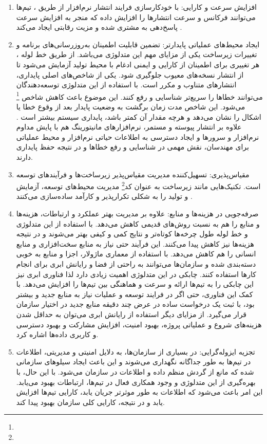\begin{enumerate}
	\item 
	افزایش سرعت و کارایی: با خودکارسازی فرایند انتشار نرم‌افزار از طریق ، تیم‌ها می‌توانند فرکانس و سرعت انتشارها را افزایش داده که منجر به افزایش سرعت پاسخ‌دهی به مشتری شده و مزیت رقابتی ایجاد می‌کند \cite{DevopsCICD1}.
	\item
	ایجاد محیط‌های عملیاتی پایدارتر: تضمین قابلیت اطمینان به‌روزرسانی‌های برنامه و تغییرات زیرساخت یکی از مزایای مهم این متدلوژی می‌باشد. از طریق خط لوله ، هر تغییری برای اطمینان از کارایی و ایمنی ادغام با محیط تولید آزمایش می‌شود تا از انتشار نسخه‌های معیوب جلوگیری شود. 
	یکی از شاخص‌های اصلی پایداری، انتشارهای متناوب و مکرر است. با استفاده از این متدلوژی توسعه‌دهندگان می‌توانند خطاها را سریع‌تر شناسایی و رفع کنند. این موضوع باعث کاهش شاخص \footnote{} می‌شود. این شاخص مدت زمان برگشت به وضعیت پایدار بعد از وقوع خطا یا اشکال را نشان می‌دهد و هرچه مقدار آن کمتر باشد، پایداری سیستم بیشتر است \cite{DevopsCD}.
	علاوه بر انتشار پیوسته و مستمر، نرم‌افزارهای مانیتورینگ هم با پایش مداوم نرم‌افزار و سرور‌ها و ایجاد دسترسی به اطلاعات حیاتی نرم‌افزار و محیط عملیاتی برای مهندسان، نقش مهمی در شناسایی و رفع خطاها و در نتیجه حفظ پایداری دارند.
	\item 
	مقیاس‌پذیری: تسهیل‌کننده مدیریت مقیاس‌پذیر زیرساخت‌ها و فرآیندهای توسعه است. تکنیک‌هایی مانند زیرساخت به عنوان کد\footnote{} مدیریت محیط‌های توسعه، آزمایش و تولید را به شکلی تکرارپذیر و کارآمد ساده‌سازی می‌کنند \cite{DevopsDef2}.
	\item 
	صرفه‌جویی در هزینه‌ها و منابع: علاوه بر مدیریت بهتر عملکرد و ارتباطات، هزینه‌ها و منابع را هم به نسبت روش‌های قدیمی کاهش می‌دهد. 
	با استفاده از این متدلوژی و خط لوله  طول چرخه‌ها کوتاه‌تر و نتایج کمی و کیفی بهتر می‌شوند و در نتیجه هزینه‌ها نیز کاهش پیدا می‌کنند. این فرآیند حتی نیاز به منابع سخت‌افزاری و منابع انسانی را هم کاهش می‌دهد. با استفاده از معماری ماژولار، اجزا و منابع به خوبی دسته‌بندی شده و سازمان‌ها می‌توانند به راحتی از فضا و رایانش ابری برای انجام کارها استفاده کنند.
	چابکی در این متدلوژی اهمیت زیادی دارد لذا فناوری ابری نیز این چابکی را به تیم‌ها ارائه و سرعت و هماهنگی بین تیم‌ها را افزایش می‌دهد. با کمک این فناوری، حتی اگر در فرایند توسعه و عملیات نیاز به منابع جدید و بیشتر بود، با ثبت یک درخواست ساده در عرض چند دقیقه منابع جدید در اختیار سازمان قرار می‌گیرد. از مزایای دیگر استفاده از رایانش ابری می‌توان به حداقل شدن هزینه‌های شروع و عملیاتی پروژه، بهبود امنیت، افزایش مشارکت و بهبود دسترسی و کاربری داده‌ها اشاره کرد.
	\item
	تجزیه ایزوله‌گرایی: در بسیاری از سازمان‌ها، به دلایل امنیتی و مدیریتی، اطلاعات در تیم‌ها به طور جداگانه نگهداری می‌شوند و این باعث ایجاد سیلوهای سازمانی شده که مانع از گردش منظم داده و اطلاعات در سازمان می‌شود.
	با این حال، با بهره‌گیری از این متدلوژی و وجود همکاری فعال در تیم‌ها، ارتباطات بهبود می‌یابد. این امر باعث می‌شود که اطلاعات به طور موثرتر جریان یابد، کارایی تیم‌ها افزایش یابد و در نتیجه، کارایی کلی سازمان بهبود پیدا کند.
\end{enumerate}


